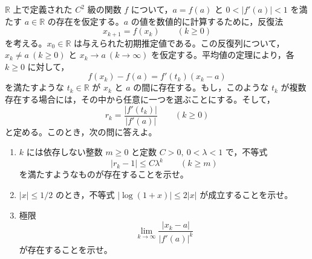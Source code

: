 \documentclass[12pt]{jlreq}
\newcommand{\R}{\mathbb{R}}
\begin{document}
\(\R\) 上で定義された \(C^2\) 級の関数 \(f\) について，\(a=f(a)\) と \(0<|f'(a)|<1\) を満たす \(a\in\R\) の存在を仮定する。\(a\) の値を数値的に計算するために，反復法
\[
  x_{k+1}=f(x_k)\qquad (k\ge0)
\]
を考える。\(x_0\in\R\) は与えられた初期推定値である。この反復列について，\(x_k\ne a\ (k\ge0)\) と \(x_k\to a\ (k\to\infty)\) を仮定する。平均値の定理により，各 \(k\ge0\) に対して，
\[
  f(x_k)-f(a)=f'(t_k)(x_k-a)
\]
を満たすような \(t_k\in\R\) が \(x_k\) と \(a\) の間に存在する。もし，このような \(t_k\) が複数存在する場合には，その中から任意に一つを選ぶことにする。そして，
\[
  r_k=\frac{|f'(t_k)|}{|f'(a)|}\qquad (k\ge0)
\]
と定める。このとき，次の問に答えよ。

\begin{enumerate}
  \item \(k\) には依存しない整数 \(m\ge0\) と定数 \(C>0,\ 0<\lambda<1\) で，不等式
  \[
    |r_k-1|\le C\lambda^k\qquad (k\ge m)
  \]
  を満たすようなものが存在することを示せ。
  \item \(|x|\le1/2\) のとき，不等式 \(|\log(1+x)|\le2|x|\) が成立することを示せ。
  \item 極限
  \[
    \lim_{k\to\infty}\frac{|x_k-a|}{|f'(a)|^k}
  \]
  が存在することを示せ。
\end{enumerate}
\end{document}
